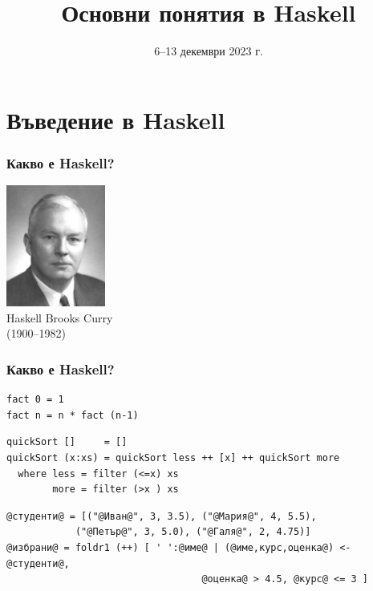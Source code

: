 \documentclass[alsotrans,beameroptions={aspectratio=169}]{beamerswitch}
\title{Основни понятия в Haskell}
\date{6--13 декември 2023 г.}
\begin{document}
\begin{frame}
  \titlepage
\end{frame}

\section{Въведение в Haskell}

\begin{frame}
  \frametitle{Какво е Haskell?}

  \pause
  \begin{center}
    \includegraphics[height=4cm]{images/HaskellBCurry.jpg}\\
    Haskell Brooks Curry\\
    (1900--1982)\\[5ex]
  \end{center}
\end{frame}

\lstset{basicstyle=\small\ttfamily}

\begin{frame}[fragile]
  \frametitle{Какво е Haskell?}

  \pause
\begin{lstlisting}
fact 0 = 1
fact n = n * fact (n-1)
\end{lstlisting}
  \pause
\begin{lstlisting}
quickSort []     = []
quickSort (x:xs) = quickSort less ++ [x] ++ quickSort more
  where less = filter (<=x) xs
        more = filter (>x ) xs
\end{lstlisting}
  \pause
\begin{lstlisting}
@студенти@ = [("@Иван@", 3, 3.5), ("@Мария@", 4, 5.5),
            ("@Петър@", 3, 5.0), ("@Галя@", 2, 4.75)]
@избрани@ = foldr1 (++) [ ' ':@име@ | (@име,курс,оценка@) <- @студенти@,
                                  @оценка@ > 4.5, @курс@ <= 3 ]
\end{lstlisting}
\end{frame}
\end{document}
